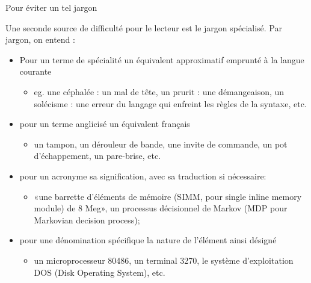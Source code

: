 \documentclass[french]{beamer}
\begin{document}
\begin{frame}{Pour éviter un tel jargon}

Une seconde source de difficulté pour le lecteur est le jargon spécialisé. Par jargon, on entend :
\begin{itemize}
	\item Pour un terme de spécialité un équivalent approximatif emprunté à la langue courante
	\begin{itemize}
		\item eg. une céphalée : un mal de tête, un prurit : une démangeaison, un solécisme : une erreur du langage qui enfreint les règles de la syntaxe, etc.
	\end{itemize} 
	\item pour un terme anglicisé un équivalent français 
	\begin{itemize}
		\item un tampon, un dérouleur de bande, une invite de commande, un pot d'échappement, un pare-brise, etc.
	\end{itemize} 
	\item pour un acronyme sa signification, avec sa traduction si nécessaire: 
	\begin{itemize}
		\item «une barrette d'éléments de mémoire (SIMM, pour single inline memory module) de 8 Meg», un processus décisionnel de Markov (MDP pour Markovian decision process);
	\end{itemize}	
	\item pour une dénomination spécifique la nature de l'élément ainsi désigné
	\begin{itemize}
		\item un microprocesseur 80486, un terminal 3270, le système d'exploitation DOS (Disk Operating System), etc.
	\end{itemize}
\end{itemize}
\end{frame}
\end{document}
